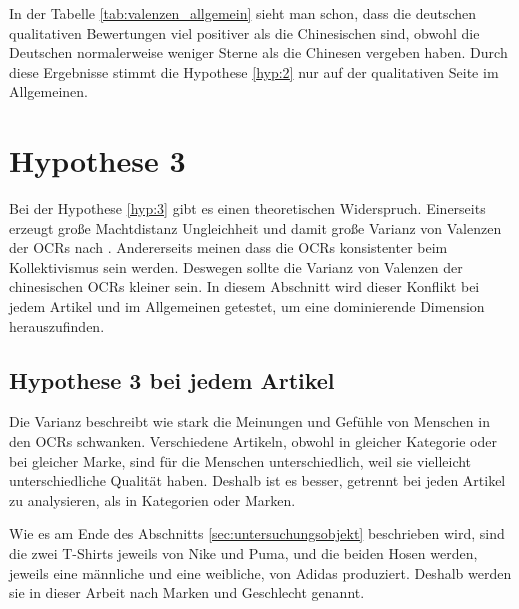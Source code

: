 In der Tabelle \ref{tab:valenzen_allgemein} sieht man schon, dass die deutschen qualitativen Bewertungen viel positiver als die Chinesischen sind, obwohl die Deutschen normalerweise weniger Sterne als die Chinesen vergeben haben. Durch diese Ergebnisse stimmt die Hypothese \ref{hyp:2} nur auf der qualitativen Seite im Allgemeinen. 

\section{Hypothese 3}
Bei der Hypothese \ref{hyp:3} gibt es einen theoretischen Widerspruch. Einerseits erzeugt große Machtdistanz Ungleichheit und damit große Varianz von Valenzen der \ac{OCRs} nach \citet{hofstede2013interkulturelle}. Andererseits meinen \citeauthor{Luo2014} dass die \ac{OCRs} konsistenter beim Kollektivismus sein werden. Deswegen sollte die Varianz von Valenzen der chinesischen \ac{OCRs} kleiner sein. In diesem Abschnitt wird dieser Konflikt bei jedem Artikel und im Allgemeinen getestet, um eine dominierende Dimension herauszufinden.
\subsection{Hypothese 3 bei jedem Artikel} \label{sec:h3_jeweils}
Die Varianz beschreibt wie stark die Meinungen und Gefühle von Menschen in den \ac{OCRs} schwanken. Verschiedene Artikeln, obwohl in gleicher Kategorie oder bei gleicher Marke, sind für die Menschen unterschiedlich, weil sie vielleicht unterschiedliche Qualität haben. Deshalb ist es besser, getrennt bei jeden Artikel zu analysieren, als in Kategorien oder Marken.

Wie es am Ende des Abschnitts \ref{sec:untersuchungsobjekt} beschrieben wird, sind die zwei T-Shirts jeweils von Nike und Puma, und die beiden Hosen werden, jeweils eine männliche und eine weibliche, von Adidas produziert. Deshalb werden sie in dieser Arbeit nach Marken und Geschlecht genannt. 

